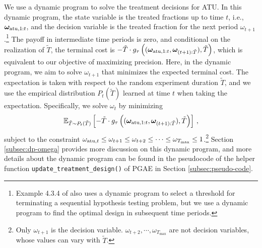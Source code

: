 {We use a dynamic program to solve the treatment decisions for ATU. In this dynamic program, the state variable is the treated fractions up to time $t$, i.e., $\bm{\omega}_{\mathrm{atu},1:t}$, and the decision variable is the treated fraction for the next period $\omega_{t+1}$.\footnote{{\blue Example 4.3.4 of \cite{bertsekas2012dynamic} also uses a dynamic program to select a threshold for terminating a sequential hypothesis testing problem, but we use a dynamic program to find the optimal design in subsequent time periods.}}  The payoff in intermediate time periods is zero, and conditional on the realization of $\tilde{T}$, the terminal cost is
$- \tilde{T} \cdot g_\tau\left((\bm{\omega}_{\mathrm{atu},1:t},
\bm{\omega}_{(t+1):\tilde{T}}), \tilde{T}\right)$, which is equivalent to our objective of maximizing precision. 
Here, in the dynamic program, we aim to solve $\omega_{t+1}$ that minimizes the expected terminal cost. The expectation is taken with respect to the random experiment duration $\tilde{T}$, and we use the empirical distribution $P_t(\tilde{T})$ learned at time $t$ when taking the expectation. Specifically, we solve $\omega_t$ by minimizing
%
\[
\+E_{\tilde{T} \sim P_t(\tilde{T})} \left[ - \tilde{T} \cdot \funfrac\left((\bm{\omega}_{\ad,1:t}, \bm{\omega}_{(t+1):\tilde{T}}), \tilde{T}\right) \right]\,,
%
\]
subject to the constraint $\omega_{\mathrm{atu},t} \leq  \omega_{t+1} \leq  \omega_{t+2} \leq \cdots \leq \omega_{T_{\max}} \leq 1$.\footnote{Only $\omega_{t+1}$ is the decision variable. $\omega_{t+2}, \cdots, \omega_{T_{\max}} $ are not decision variables, whose values can vary with $\tilde{T}$.}
Section \ref{subsec:dp-omega} provides more discussion on this dynamic program, and more details about the dynamic program can be found in the pseudocode of the helper function \texttt{update\_treatment\_design()} of PGAE in Section \ref{subsec:pseudo-code}.

}



